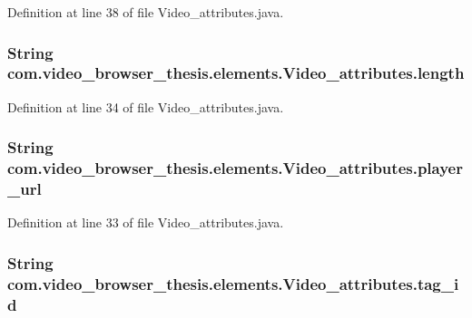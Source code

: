 Definition at line 38 of file Video\-\_\-attributes.\-java.

\hypertarget{classcom_1_1video__browser__thesis_1_1elements_1_1_video__attributes_aae8458cd610150fe777bcfed6ce6b2e5}{
\subsubsection[{length}]{\setlength{\rightskip}{0pt plus 5cm}String com.\-video\-\_\-browser\-\_\-thesis.\-elements.\-Video\-\_\-attributes.\-length}}\label{classcom_1_1video__browser__thesis_1_1elements_1_1_video__attributes_aae8458cd610150fe777bcfed6ce6b2e5}


Definition at line 34 of file Video\-\_\-attributes.\-java.

\hypertarget{classcom_1_1video__browser__thesis_1_1elements_1_1_video__attributes_a52b04c0ee9b91beafc8bb585d7c968b2}{
\subsubsection[{player\-\_\-url}]{\setlength{\rightskip}{0pt plus 5cm}String com.\-video\-\_\-browser\-\_\-thesis.\-elements.\-Video\-\_\-attributes.\-player\-\_\-url}}\label{classcom_1_1video__browser__thesis_1_1elements_1_1_video__attributes_a52b04c0ee9b91beafc8bb585d7c968b2}


Definition at line 33 of file Video\-\_\-attributes.\-java.

\hypertarget{classcom_1_1video__browser__thesis_1_1elements_1_1_video__attributes_a12b1f3d1b5415ac60dddba277c4ddebc}{
\subsubsection[{tag\-\_\-id}]{\setlength{\rightskip}{0pt plus 5cm}String com.\-video\-\_\-browser\-\_\-thesis.\-elements.\-Video\-\_\-attributes.\-tag\-\_\-id}}\label{classcom_1_1video__browser__thesis_1_1elements_1_1_video__attributes_a12b1f3d1b5415ac60dddba277c4ddebc}


